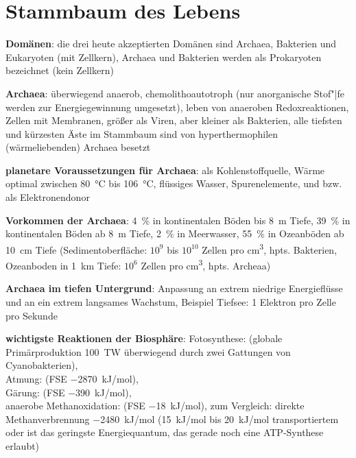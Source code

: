 \pagebreak

\section{%
    Stammbaum des Lebens%
}

\textbf{Domänen}:
die drei heute akzeptierten Domänen sind Archaea, Bakterien und Eukaryoten (mit Zellkern),
Archaea und Bakterien werden als Prokaryoten bezeichnet (kein Zellkern)

\textbf{Archaea}:
überwiegend anaerob,
chemolithoautotroph (nur anorganische Stof"|fe werden zur Energiegewinnung umgesetzt),
leben von anaeroben Redoxreaktionen,
Zellen mit Membranen,
größer als Viren, aber kleiner als Bakterien,
alle tiefsten und kürzesten Äste im Stammbaum sind von hyperthermophilen (wärmeliebenden)
Archaea besetzt

\textbf{planetare Voraussetzungen für Archaea}:
 als Kohlenstoffquelle,
Wärme optimal zwischen \SI{80}{\celsius} bis \SI{106}{\celsius},
flüssiges Wasser,
Spurenelemente,
 und  bzw.  als Elektronendonor

\textbf{Vorkommen der Archaea}:
\SI{4}{\percent} in kontinentalen Böden bis \SI{8}{\meter} Tiefe,
\SI{39}{\percent} in kontinentalen Böden ab \SI{8}{\meter} Tiefe,
\SI{2}{\percent} in Meerwasser,
\SI{55}{\percent} in Ozeanböden ab \SI{10}{\centi\meter} Tiefe
(Sedimentoberfläche: $10^9$ bis $10^{10}$ Zellen pro \si{\centi\meter\cubed}, hpts. Bakterien,
Ozeanboden in \SI{1}{\kilo\meter} Tiefe: $10^6$ Zellen pro \si{\centi\meter\cubed}, hpts. Archeaa)

\textbf{Archaea im tiefen Untergrund}:
Anpassung an extrem niedrige Energieflüsse und an ein extrem langsames Wachstum,
Beispiel Tiefsee: 1 Elektron pro Zelle pro Sekunde

\textbf{wichtigste Reaktionen der Biosphäre}:
Fotosynthese:  (globale Primärproduktion \SI{100}{\tera\watt}
überwiegend durch zwei Gattungen von Cyanobakterien),\\
Atmung:  (FSE \SI{-2870}{\kilo\joule/\mol}),\\
Gärung:  (FSE \SI{-390}{\kilo\joule/\mol}),\\
anaerobe Methanoxidation: 
(FSE \SI{-18}{\kilo\joule/\mol}),
zum Vergleich: direkte Methanverbrennung \SI{-2480}{\kilo\joule/\mol}
(\SI{+15}{\kilo\joule/\mol} bis \SI{20}{\kilo\joule/\mol} transportiertem  oder  ist
das geringste Energiequantum, das gerade noch eine ATP-Synthese erlaubt)

